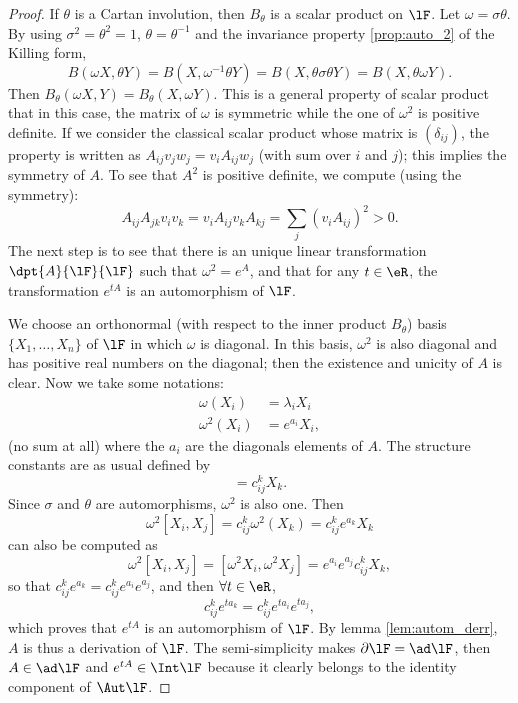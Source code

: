 \begin{proof}
If $\theta$ is a Cartan involution, then $B_{\theta}$ is a scalar product on $\lF$. Let $\omega=\sigma\theta$. By using $\sigma^2=\theta^2=1$, $\theta=\theta^{-1}$ and the invariance property \ref{prop:auto_2} of the Killing form,
\begin{equation}
B(\omega X,\theta Y)=B(X,\omega^{-1}\theta Y)
                    =B(X,\theta\sigma\theta Y)
            =B(X,\theta\omega Y).
\end{equation}
Then $B_{\theta}(\omega X,Y)=B_{\theta}(X,\omega Y)$. This is a general property of scalar product that in this case, the matrix of $\omega$ is symmetric while the one of $\omega^2$ is positive definite. If we consider the classical scalar product whose matrix is $(\delta_{ij})$, the property is written as $A_{ij}v_jw_j=v_iA_{ij}w_j$ (with sum over $i$ and $j$); this implies the symmetry of $A$. To see that $A^2$ is positive definite, we compute (using the symmetry):
\[
   A_{ij}A_{jk}v_iv_k=v_iA_{ij}v_kA_{kj}=\sum_j(v_iA_{ij})^2>0.
\]
The next step is to see that there is an unique linear transformation $\dpt{A}{\lF}{\lF}$ such that $\omega^2=e^A$, and that for any $t\in\eR$, the transformation $e^{tA}$ is an automorphism of $\lF$.

We choose an orthonormal (with respect to the inner product $B_{\theta}$) basis $\{X_1,\ldots,X_n\}$  of $\lF$ in which $\omega$ is diagonal. In this basis, $\omega^2$ is also diagonal and has positive real numbers on the diagonal; then the existence and unicity of $A$ is clear. Now we take some notations:
\begin{subequations}
\begin{align}
  \omega(X_i)&=\lambda_iX_i\\
  \omega^2(X_i)&=e^{a_i}X_i,
\end{align}  
\end{subequations}
(no sum at all) where the $a_i$ are the diagonals elements of $A$. The structure constants are as usual defined by
\begin{equation}
   [X_i,X_j]=c_{ij}^kX_k.  
\end{equation}
Since $\sigma$ and $\theta$ are automorphisms, $\omega^2$ is also one. Then 
\[
\omega^2[X_i,X_j]=c_{ij}^k\omega^2(X_k)=c_{ij}^ke^{a_k}X_k
\]
can also be computed as
\[
   \omega^2[X_i,X_j]=[\omega^2X_i,\omega^2X_j]=e^{a_i}e^{a_j}c_{ij}^kX_k,
\]
so that $c_{ij}^ke^{a_k}=c_{ij}^ke^{a_i}e^{a_j}$, and then $\forall t\in\eR$,
\[
   c_{ij}^ke^{ta_k}=c_{ij}^ke^{ta_i}e^{ta_j},
\]
which proves that $e^{tA}$ is an automorphism of $\lF$. By lemma \ref{lem:autom_derr}, $A$ is thus a derivation of $\lF$. The semi-simplicity makes $\partial\lF=\ad\lF$, then $A\in\ad\lF$ and $e^{tA}\in\Int\lF$ because it clearly belongs to the identity component of $\Aut\lF$.


\end{proof}
